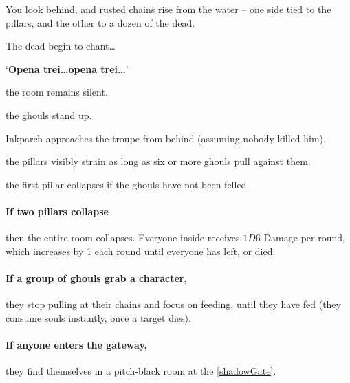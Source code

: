 \begin{boxtext}
  You look behind, and rusted chains rise from the water -- one side tied to the pillars, and the other to a dozen of the dead.

  The dead begin to chant\ldots

  `\textbf{Opena trei\ldots opena trei\ldots}'
\end{boxtext}

\begin{list}{\bfseries On round~. }{}
  \item
  the room remains silent.
  \item
  the ghouls stand up.
  \item
  Inkparch approaches the troupe from behind (assuming nobody killed him).
  \item
  the pillars visibly strain as long as six or more ghouls pull against them.
  \item
  the first pillar collapses if the ghouls have not been felled.
\end{list}

\paragraph{If two pillars collapse}
then the entire room collapses.
Everyone inside receives $1D6$ Damage per round, which increases by 1 each round until everyone has left, or died.

\paragraph{If a group of ghouls grab a character,}
they stop pulling at their chains and focus on feeding, until they have fed (they consume souls instantly, once a target dies).

\bigLine

\paragraph{If anyone enters the gateway,}
they find themselves in a pitch-black room at the  \vref{shadowGate}.

